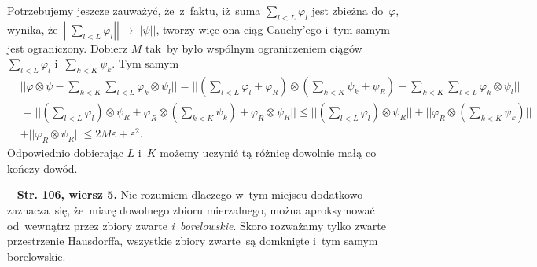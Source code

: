 \documentclass[a4paper,11pt]{article}
\newcommand{\ra}{\rightarrow}
\newcommand{\veps}{\varepsilon}
\newcommand{\vp}{\varphi}
\newcommand{\ot}{\otimes}
\newcommand{\Sum}{\sum\limits}
\newcommand{\norm}[1]{\left|\left| #1 \right|\right|}
\newcommand{\tb}{\textbf}
\newcommand{\noi}{\noindent}
\newcommand{\start}{\noi \tb{--} {}}
\newcommand{\StrWg}[2]{\tb{Str. #1, wiersz #2.}}
\begin{document}
Potrzebujemy jeszcze zauważyć, że~z~faktu, iż~suma
$\sum_{ l < L } \vp_{ l }$ jest zbieżna do~$\vp$, wynika,
że~$\norm{ \sum_{ l < L } \vp_{ l } } \ra \norm{ \psi }$, tworzy więc
ona ciąg Cauchy'ego i~tym samym jest ograniczony.
Dobierz %
$M$ tak~by było wspólnym ograniczeniem ciągów
$\sum_{ l < L } \vp_{ l }$ i~$\sum_{ k < K } \psi_{ k }$. Tym samym
\begin{displaymath}
  \begin{split}
    & || \vp \ot \psi - \Sum_{ k < K }\Sum_{ l < L } \vp_{ k } \ot
    \psi_{ l } || = || ( \Sum_{ l < L } \vp_{ l } + \vp_{ R } ) \ot (
    \Sum_{ k < K } \psi_{ k } + \psi_{ R } )
    - \Sum_{ k < K }\Sum_{ l < L } \vp_{ k } \ot \psi_{ l } || \\
    &= || ( \Sum_{ l < L } \vp_{ l } ) \ot \psi_{ R } + \vp_{ R } \ot
    ( \Sum_{ k < K } \psi_{ k } ) + \vp_{ R } \ot \psi_{ R } || \leq
    || ( \Sum_{ l < L } \vp_{ l } ) \ot \psi_{ R } ||
    + || \vp_{ R } \ot ( \Sum_{ k < K } \psi_{ k } ) || \\
    &+ || \vp_{ R } \ot \psi_{ R } || \leq 2 M \veps + \veps^{ 2 }.
  \end{split}
\end{displaymath}
Odpowiednio dobierając $L$ i~$K$ możemy uczynić tą różnicę dowolnie
małą co kończy dowód.

\start \StrWg{106}{5} Nie rozumiem dlaczego w~tym miejscu dodatkowo
zaznacza~się, że~miarę dowolnego zbioru mierzalnego, można
aproksymować od~wewnątrz przez zbiory zwarte \emph{i~borelowskie}.
Skoro rozważamy tylko zwarte przestrzenie Hausdorffa, wszystkie zbiory
zwarte~są domknięte i~tym samym borelowskie.

\newpage
\end{document}
